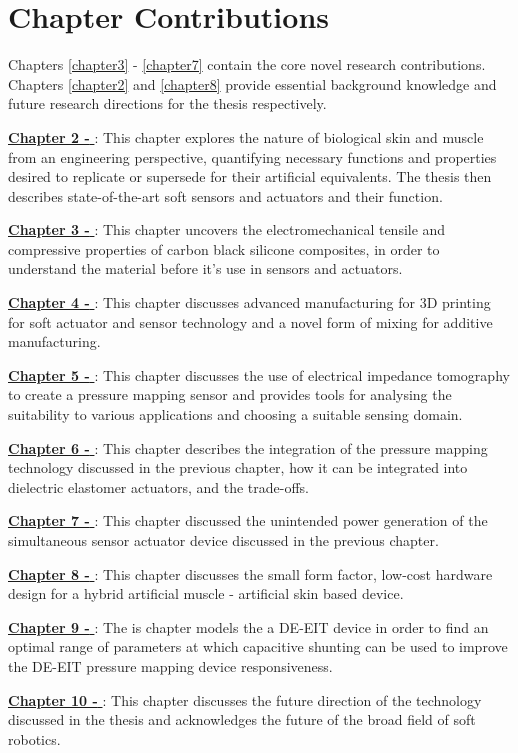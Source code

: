 \section{Chapter Contributions}
Chapters \ref{chapter3} - \ref{chapter7} contain the core novel research contributions. Chapters \ref{chapter2} and \ref{chapter8} provide essential background knowledge and future research directions for the thesis respectively.

\hyperref[chapter2]{\textbf{Chapter 2 - \chapiiname}}: This chapter explores the nature of biological skin and muscle from an engineering perspective, quantifying necessary functions and properties desired to replicate or supersede for their artificial equivalents. The thesis then describes state-of-the-art soft sensors and actuators and their function.

\hyperref[chapter3]{\textbf{Chapter 3 - \chapiiiname}}: This chapter uncovers the electromechanical tensile and compressive properties of carbon black silicone composites, in order to understand the material before it's use in sensors and actuators.

\hyperref[chapter4]{\textbf{Chapter 4 - \chapivname}}: This chapter discusses advanced manufacturing for 3D printing for soft actuator and sensor technology and a novel form of mixing for additive manufacturing.

\hyperref[chapter5]{\textbf{Chapter 5 - \chapvname}}: This chapter discusses the use of electrical impedance tomography to create a pressure mapping sensor and provides tools for analysing the suitability to various applications and choosing a suitable sensing domain.

\hyperref[chapter6]{\textbf{Chapter 6 - \chapviname}}: This chapter describes the integration of the pressure mapping technology discussed in the previous chapter, how it can be integrated into dielectric elastomer actuators, and the trade-offs.

\hyperref[chapter7]{\textbf{Chapter 7 - \chapviiname}}: This chapter discussed the unintended power generation of the simultaneous sensor actuator device discussed in the previous chapter.

\hyperref[chapter8]{\textbf{Chapter 8 - \chapviiiname}}: This chapter discusses the small form factor, low-cost hardware design for a hybrid artificial muscle - artificial skin based device.

\hyperref[chapter9]{\textbf{Chapter 9 - \chapixname}}: The is chapter models the a DE-EIT device in order to find an optimal range of parameters at which capacitive shunting can be used to improve the DE-EIT pressure mapping device responsiveness.

\hyperref[chapter10]{\textbf{Chapter 10 - \chapxname}}: This chapter discusses the future direction of the technology discussed in the thesis and acknowledges the future of the broad field of soft robotics.